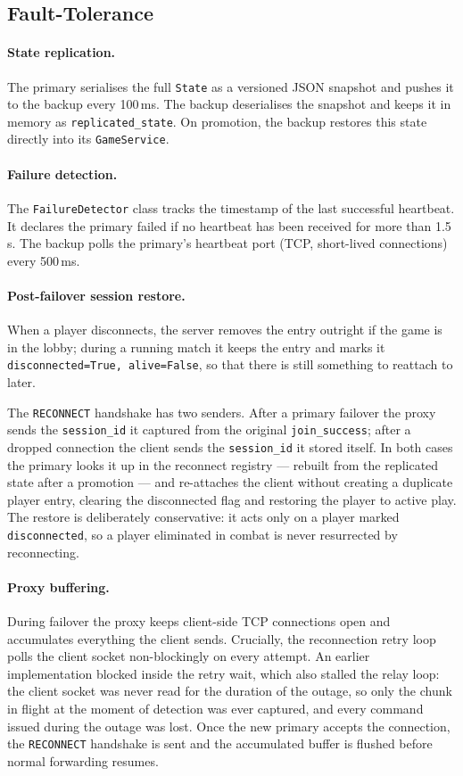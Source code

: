 \documentclass{scrartcl}
\begin{document}
\subsection{Fault-Tolerance}\label{fault-tolerance}

\paragraph{State replication.}
The primary serialises the full \texttt{State} as a versioned JSON snapshot and pushes it to the backup every 100\,ms.
The backup deserialises the snapshot and keeps it in memory as \texttt{replicated\_state}.
On promotion, the backup restores this state directly into its \texttt{GameService}.

\paragraph{Failure detection.}
The \texttt{FailureDetector} class tracks the timestamp of the last successful heartbeat.
It declares the primary failed if no heartbeat has been received for more than 1.5\,s.
The backup polls the primary's heartbeat port (TCP, short-lived connections) every 500\,ms.

\paragraph{Post-failover session restore.}
When a player disconnects, the server removes the entry outright if the game is in
the lobby; during a running match it keeps the entry and marks it
\texttt{disconnected=True, alive=False}, so that there is still something to
reattach to later.

The \texttt{RECONNECT} handshake has two senders. After a primary failover the
proxy sends the \texttt{session\_id} it captured from the original
\texttt{join\_success}; after a dropped connection the client sends the
\texttt{session\_id} it stored itself. In both cases the primary looks it up in the
reconnect registry --- rebuilt from the replicated state after a promotion --- and
re-attaches the client without creating a duplicate player entry, clearing the
disconnected flag and restoring the player to active play. The restore is
deliberately conservative: it acts only on a player marked \texttt{disconnected}, so
a player eliminated in combat is never resurrected by reconnecting.

\paragraph{Proxy buffering.}
During failover the proxy keeps client-side TCP connections open and accumulates
everything the client sends. Crucially, the reconnection retry loop polls the
client socket non-blockingly on every attempt. An earlier implementation blocked
inside the retry wait, which also stalled the relay loop: the client socket was
never read for the duration of the outage, so only the chunk in flight at the
moment of detection was ever captured, and every command issued during the outage
was lost. Once the new primary accepts the connection, the
\texttt{RECONNECT} handshake is sent and the accumulated buffer is flushed before
normal forwarding resumes.
\end{document}
